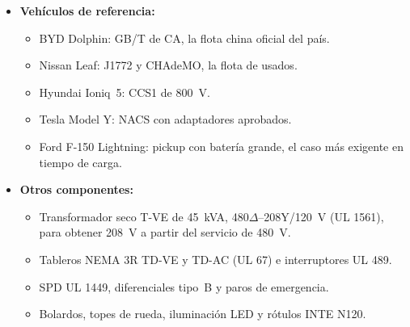 \begin{itemize}
\item \textbf{Vehículos de referencia:}
  \begin{itemize}
  \item BYD Dolphin: GB/T de CA, la flota china oficial del país.
  \item Nissan Leaf: J1772 y CHAdeMO, la flota de usados.
  \item Hyundai Ioniq~5: CCS1 de 800~V.
  \item Tesla Model Y: NACS con adaptadores aprobados.
  \item Ford F-150 Lightning: pickup con batería grande, el caso más exigente en tiempo de carga.
  \end{itemize}
\item \textbf{Otros componentes:}
  \begin{itemize}
  \item Transformador seco T-VE de 45~kVA, 480$\Delta$--208Y/120~V (UL 1561), para obtener 208~V a partir del servicio de 480~V.
  \item Tableros NEMA 3R TD-VE y TD-AC (UL 67) e interruptores UL 489.
  \item SPD UL 1449, diferenciales tipo~B y paros de emergencia.
  \item Bolardos, topes de rueda, iluminación LED y rótulos INTE N120.
  \end{itemize}
\end{itemize}
